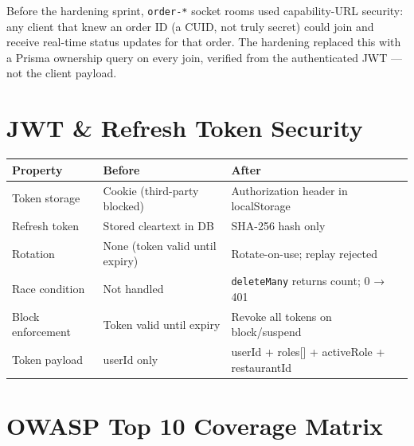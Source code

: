 \documentclass[11pt,a4paper,twoside]{book}
\newcommand{\th}[1]{\textbf{\color{white}#1}}
\begin{document}
Before the hardening sprint, \texttt{order-*} socket rooms used capability-URL
security: any client that knew an order ID (a CUID, not truly secret) could join
and receive real-time status updates for that order.  The hardening replaced this
with a Prisma ownership query on every join, verified from the authenticated
JWT — not the client payload.

\section{JWT \& Refresh Token Security}

\begin{center}\small
\begin{tabular}{p{4cm}p{4cm}p{5cm}}
\toprule
\rowcolor{headbg}\th{Property} & \th{Before} & \th{After} \\
\midrule
Token storage      & Cookie (third-party blocked) & Authorization header in localStorage \\
\rowcolor{rowalt}Refresh token      & Stored cleartext in DB & SHA-256 hash only \\
Rotation           & None (token valid until expiry) & Rotate-on-use; replay rejected \\
\rowcolor{rowalt}Race condition     & Not handled & \texttt{deleteMany} returns count; 0 → 401 \\
Block enforcement  & Token valid until expiry & Revoke all tokens on block/suspend \\
\rowcolor{rowalt}Token payload      & userId only & userId + roles[] + activeRole + restaurantId \\
\bottomrule
\end{tabular}
\end{center}

\section{OWASP Top 10 Coverage Matrix}
\end{document}

